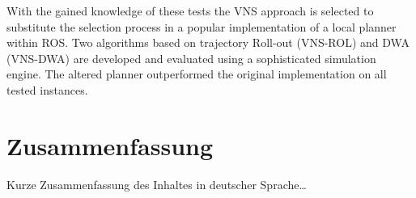 With the gained knowledge of these tests the \ac{VNS} approach is selected to substitute the selection process in a popular implementation of a local planner within \ac{ROS}. 
Two algorithms based on trajectory Roll-out (VNS-ROL) and \ac{DWA} (VNS-DWA) are developed and  evaluated using a sophisticated simulation engine. The altered planner outperformed the original implementation on all tested instances.


\vfill
\newpage

\chapter*{Zusammenfassung}
Kurze Zusammenfassung des Inhaltes in deutscher Sprache\dots


\endgroup			

\vfill